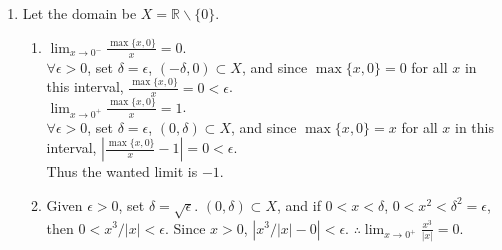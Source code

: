 \documentclass[11pt]{report}
\newcommand{\ra}{\rightarrow}
\newcommand{\abs}[1]{\left|#1\right|}
\newcommand{\ds}{\displaystyle}
\newcommand{\imp}{\implies}
\newcommand{\bs}{\backslash}
\newcommand{\mimp}{$\implies$}
\newcommand{\R}{\mathbb{R}}
\begin{document}
\begin{enumerate}
\begin{enumerate}
	($x_n^2 + y_n^2 < 3$ can be easily checked), and it converges to $(x_0, y_0)$. It can be easily seen that $g(x_n, y_n) \ra g(x_0, y_0)$, because $1/n \ra 0$. Thus $g(x)$ is a continuous extension of $f$ to $\overline{X}$ and therefore $f$ is uniformly continuous on $X$.
	\item (\mimp) Since $f$ is uniformly continuous on $(a, b)$, there exists a continuous extension $g$ of $f$ to $[a, b]$. Since $g(x)$ is continuous at $x = a$, $\forall \epsilon > 0$, $\exists\,\delta$ s.t. $x\in \overline{X}$, $\abs{x - a} < \delta \imp \abs{g(x) - g(a)} <\epsilon$. Observe that $x\in \overline{X}, \abs{x-a} < \delta$ is equivalent to $x\in [a, a+\delta)$. Thus $(a, a + \delta) \subset [a, b]$, and we have $$x\in (a, a+\delta) \imp x\in [a, a+ \delta) \imp \abs{g(x) - g(a)} = \abs{f(x) - g(a)} < \epsilon$$Now by definition, $\lim_{x \ra a^+}f(x) = g(a)$.\\
	Similarly, since $g(x)$ is continuous on $x= b$, $\forall \epsilon > 0$, $\exists\,\delta$ s.t. $x\in \overline{X}$, $\abs{x - b} < \delta \imp \abs{g(x) - g(b)} <\epsilon$. Observe that $x\in \overline{X}, \abs{x-b} < \delta$ is equivalent to $x\in (b-\delta, b]$. Thus $(b-\delta, b) \subset [a, b]$, and we have $$x\in (b-\delta, b) \imp x\in (b - \delta, b] \imp \abs{g(x) - g(b)} = \abs{f(x) - g(b)} < \epsilon$$Now by definition, $\lim_{x \ra b^-}f(x) = g(b)$.
\end{enumerate}

\item Let the domain be $X = \R\bs\{0\}$.
\begin{enumerate}
	\item $\ds\lim_{x\ra0^-}\frac{\max\{x, 0\}}{x} = 0$.\\
	$\forall \epsilon> 0$, set $\delta = \epsilon$, $(-\delta, 0)\subset X$, and since $\max\{x, 0\} =0$ for all $x$ in this interval, $\frac{\max\{x, 0\}}{x} = 0 < \epsilon$.\\
	$\ds\lim_{x\ra0^+}\frac{\max\{x, 0\}}{x} = 1$.\\
	$\forall \epsilon> 0$, set $\delta = \epsilon$, $(0, \delta)\subset X$, and since $\max\{x, 0\} =x$ for all $x$ in this interval, $\abs{\frac{\max\{x, 0\}}{x}-1} = 0 < \epsilon$.\\
	Thus the wanted limit is $-1$.
	\item Given $\epsilon >0$, set $\delta = \sqrt{\epsilon}$. $(0, \delta) \subset X$, and if $0<x<\delta$, $0 < x^2 < \delta^2 = \epsilon$, then $0 < x^3/\abs{x} < \epsilon$. Since $x >0$, $\abs{x^3/\abs{x} - 0} < \epsilon$. $\therefore\ds \lim_{x\ra0^+}$$\frac{x^3}{\abs{x}} = 0$.
\end{enumerate}


\end{enumerate}
\end{document}
